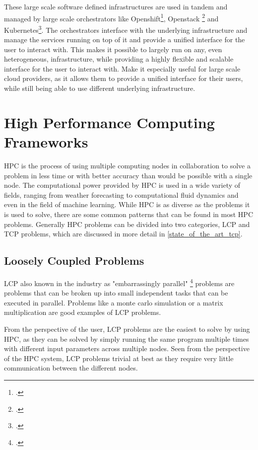 These large scale software defined infrastructures are used in tandem and managed by large scale orchestrators like Openshift\footcite{RedHatOpenShift}, Openstack \footcite{OpenSourceCloud} and Kubernetes\footcite{ProductionGradeContainerOrchestration}. 
The orchestrators interface with the underlying infrastructure and manage the services running on top of it and provide a unified interface for the user to interact with.
This makes it possible to largely run on any, even heterogeneous, infrastructure, while providing a highly flexible and scalable interface for the user to interact with.
Make it especially useful for large scale cloud providers, as it allows them to provide a unified interface for their users, while still being able to use different underlying infrastructure.

\section{High Performance Computing Frameworks}

\ac{HPC} is the process of using multiple computing nodes in collaboration to solve a problem in less time or with better accuracy than would be possible with a single node.
 The computational power provided by \ac{HPC} is used in a wide variety of fields, ranging from weather forecasting to computational fluid dynamics and even in the field of machine learning.
While \ac{HPC} is as diverse as the problems it is used to solve, there are some common patterns that can be found in most \ac{HPC} problems.
Generally \ac{HPC} problems can be divided into two categories, \ac{LCP} and \ac{TCP} problems, which are discussed in more detail in \ref{state_of_the_art_tcp}.


\subsection{Loosely Coupled Problems}

\ac{LCP} also known in the industry as "embarrassingly parallel" \footcite{brownEngineeringBeowulfstyleCompute2004} problems are problems that can be broken up into small independent tasks that can be executed in parallel.
Problems like a monte carlo simulation or a matrix multiplication are good examples of \ac{LCP} problems.

From the perspective of the user, \ac{LCP} problems are the easiest to solve by using \ac{HPC}, as they can be solved by simply running the same program multiple times with different input parameters across multiple nodes.
Seen from the perspective of the \ac{HPC} system, \ac{LCP} problems trivial at best as they require very little communication between the different nodes.

